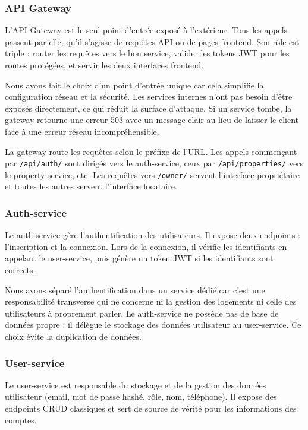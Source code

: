 \documentclass[12pt, a4paper]{article}
\begin{document}
\subsubsection{API Gateway}

L'API Gateway est le seul point d'entrée exposé à l'extérieur. Tous les appels passent par elle, qu'il s'agisse de requêtes API ou de pages frontend. Son rôle est triple : router les requêtes vers le bon service, valider les tokens JWT pour les routes protégées, et servir les deux interfaces frontend.

Nous avons fait le choix d'un point d'entrée unique car cela simplifie la configuration réseau et la sécurité. Les services internes n'ont pas besoin d'être exposés directement, ce qui réduit la surface d'attaque. Si un service tombe, la gateway retourne une erreur 503 avec un message clair au lieu de laisser le client face à une erreur réseau incompréhensible.

La gateway route les requêtes selon le préfixe de l'URL. Les appels commençant par \texttt{/api/auth/} sont dirigés vers le auth-service, ceux par \texttt{/api/properties/} vers le property-service, etc. Les requêtes vers \texttt{/owner/} servent l'interface propriétaire et toutes les autres servent l'interface locataire.

\subsubsection{Auth-service}

Le auth-service gère l'authentification des utilisateurs. Il expose deux endpoints : l'inscription et la connexion. Lors de la connexion, il vérifie les identifiants en appelant le user-service, puis génère un token JWT si les identifiants sont corrects.

Nous avons séparé l'authentification dans un service dédié car c'est une responsabilité transverse qui ne concerne ni la gestion des logements ni celle des utilisateurs à proprement parler. Le auth-service ne possède pas de base de données propre : il délègue le stockage des données utilisateur au user-service. Ce choix évite la duplication de données.

\subsubsection{User-service}

Le user-service est responsable du stockage et de la gestion des données utilisateur (email, mot de passe hashé, rôle, nom, téléphone). Il expose des endpoints CRUD classiques et sert de source de vérité pour les informations des comptes.
\end{document}
